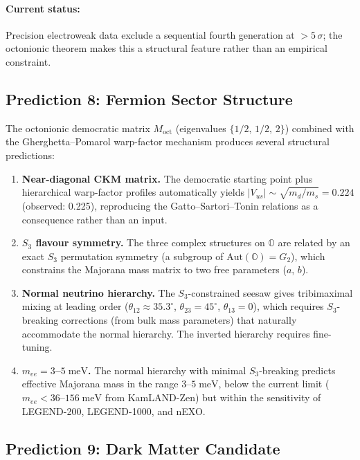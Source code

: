 \paragraph{Current status:} Precision electroweak data exclude a sequential fourth generation at $>5\,\sigma$; the octonionic theorem makes this a structural feature rather than an empirical constraint.

\subsection{Prediction 8: Fermion Sector Structure}
\label{sec:1-pred8}

The octonionic democratic matrix $M_\mathrm{oct}$ (eigenvalues $\{1/2,\, 1/2,\, 2\}$) combined with the Gherghetta--Pomarol warp-factor mechanism produces several structural predictions:
\begin{enumerate}
\item \textbf{Near-diagonal CKM matrix.} The democratic starting point plus hierarchical warp-factor profiles automatically yields $|V_{us}| \sim \sqrt{m_d/m_s} = 0.224$ (observed: 0.225), reproducing the Gatto--Sartori--Tonin relations as a consequence rather than an input.
\item \textbf{$S_3$ flavour symmetry.} The three complex structures on $\mathbb{O}$ are related by an exact $S_3$ permutation symmetry (a subgroup of $\mathrm{Aut}(\mathbb{O}) = G_2$), which constrains the Majorana mass matrix to two free parameters ($a$, $b$).
\item \textbf{Normal neutrino hierarchy.} The $S_3$-constrained seesaw gives tribimaximal mixing at leading order ($\theta_{12} \approx 35.3^\circ$, $\theta_{23} = 45^\circ$, $\theta_{13} = 0$), which requires $S_3$-breaking corrections (from bulk mass parameters) that naturally accommodate the normal hierarchy. The inverted hierarchy requires fine-tuning.
\item \textbf{$m_{ee} = 3$--$5\;\mathrm{meV}$.} The normal hierarchy with minimal $S_3$-breaking predicts effective Majorana mass in the range $3$--$5\;\mathrm{meV}$, below the current limit ($m_{ee} < 36$--$156\;\mathrm{meV}$ from KamLAND-Zen) but within the sensitivity of LEGEND-200, LEGEND-1000, and nEXO.
\end{enumerate}

\subsection{Prediction 9: Dark Matter Candidate}
\label{sec:1-pred9}

